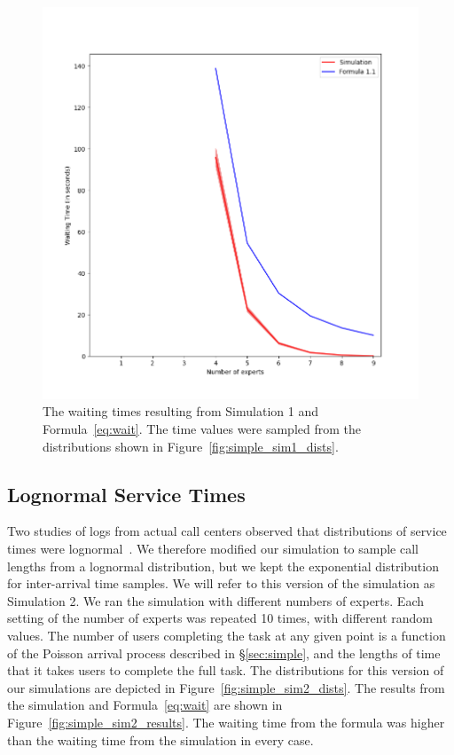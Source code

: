 \begin{figure}[H]
  \includegraphics[width=\textwidth]{figures/montecarlo/independent_calls_expon.png}
  \caption{
    The waiting times resulting from Simulation 1 and Formula~\ref{eq:wait}.
    The time values were sampled from the distributions shown in
    Figure~\ref{fig:simple_sim1_dists}.
  }\label{fig:simple_sim1_results}
\end{figure}

\subsection{Lognormal Service Times}

Two studies of logs from actual call centers observed that distributions of
service times were lognormal~\cite{queue1, queue2}.
We therefore modified our simulation to sample call lengths from a lognormal
distribution, but we kept the exponential distribution for inter-arrival time
samples.
We will refer to this version of the simulation as Simulation 2.
We ran the simulation with different numbers of experts.
Each setting of the number of experts was repeated 10 times, with different
random values.
The number of users completing the task at any given point is a function of the
Poisson arrival process described in \S\ref{sec:simple}, and the lengths of time
that it takes users to complete the full task.
The distributions for this version of our simulations are depicted in
Figure~\ref{fig:simple_sim2_dists}.
The results from the simulation and Formula~\ref{eq:wait} are shown in
Figure~\ref{fig:simple_sim2_results}.
The waiting time from the formula was higher than the waiting time from
the simulation in every case.

